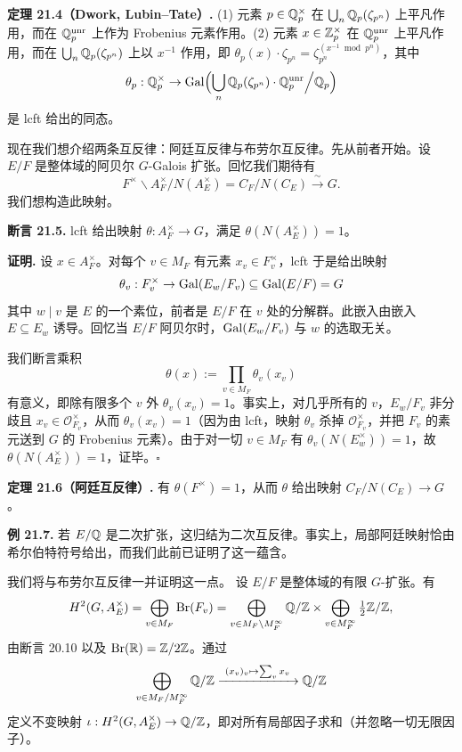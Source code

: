 \textbf{定理 21.4（Dwork, Lubin--Tate）.} (1) 元素 $p\in\mathbb{Q}_p^\times$ 在 $\bigcup_n\mathbb{Q}_p(\zeta_{p^n})$ 上平凡作用，而在 $\mathbb{Q}_p^{\mathrm{unr}}$ 上作为 Frobenius 元素作用。(2) 元素 $x\in\mathbb{Z}_p^\times$ 在 $\mathbb{Q}_p^{\mathrm{unr}}$ 上平凡作用，而在 $\bigcup_n\mathbb{Q}_p(\zeta_{p^n})$ 上以 $x^{-1}$ 作用，即 $\theta_p(x)\cdot\zeta_{p^n}=\zeta_{p^n}^{(x^{-1}\bmod p^n)}$，其中
\[
\theta_p:\mathbb{Q}_p^\times\to\operatorname{Gal}\Bigl(\bigcup_n\mathbb{Q}_p(\zeta_{p^n})\cdot\mathbb{Q}_p^{\mathrm{unr}}\Big/\mathbb{Q}_p\Bigr)
\]
是 lcft 给出的同态。

现在我们想介绍两条互反律：阿廷互反律与布劳尔互反律。先从前者开始。设 $E/F$ 是整体域的阿贝尔 $G$-Galois 扩张。回忆我们期待有
\[
F^\times\backslash A_F^\times/N(A_E^\times)=C_F/N(C_E)\xrightarrow{\ \sim\ }G.
\]
我们想构造此映射。

\textbf{断言 21.5.} lcft 给出映射 $\theta:A_F^\times\to G$，满足 $\theta(N(A_E^\times))=1$。

\textbf{证明.} 设 $x\in A_F^\times$。对每个 $v\in M_F$ 有元素 $x_v\in F_v^\times$，lcft 于是给出映射
\[
\theta_v:F_v^\times\to\operatorname{Gal}(E_w/F_v)\subseteq\operatorname{Gal}(E/F)=G
\]
其中 $w\mid v$ 是 $E$ 的一个素位，前者是 $E/F$ 在 $v$ 处的分解群。此嵌入由嵌入 $E\subseteq E_w$ 诱导。回忆当 $E/F$ 阿贝尔时，$\operatorname{Gal}(E_w/F_v)$ 与 $w$ 的选取无关。

我们断言乘积
\[
\theta(x):=\prod_{v\in M_F}\theta_v(x_v)
\]
有意义，即除有限多个 $v$ 外 $\theta_v(x_v)=1$。事实上，对几乎所有的 $v$，$E_w/F_v$ 非分歧且 $x_v\in\mathcal{O}_{F_v}^\times$，从而 $\theta_v(x_v)=1$（因为由 lcft，映射 $\theta_v$ 杀掉 $\mathcal{O}_{F_v}^\times$，并把 $F_v$ 的素元送到 $G$ 的 Frobenius 元素）。由于对一切 $v\in M_F$ 有 $\theta_v(N(E_w^\times))=1$，故 $\theta(N(A_E^\times))=1$，证毕。\hfill$\square$

\textbf{定理 21.6（阿廷互反律）.} 有 $\theta(F^\times)=1$，从而 $\theta$ 给出映射 $C_F/N(C_E)\to G$。

\textbf{例 21.7.} 若 $E/\mathbb{Q}$ 是二次扩张，这归结为二次互反律。事实上，局部阿廷映射恰由希尔伯特符号给出，而我们此前已证明了这一蕴含。

我们将与布劳尔互反律一并证明这一点。
设 $E/F$ 是整体域的有限 $G$-扩张。有
\[
H^2(G,A_E^\times)=\bigoplus_{v\in M_F}\operatorname{Br}(F_v)=\bigoplus_{v\in M_F\setminus M_F^\infty}\mathbb{Q}/\mathbb{Z}\times\bigoplus_{v\in M_F^\infty}\tfrac12\mathbb{Z}/\mathbb{Z},
\]
由断言 20.10 以及 $\operatorname{Br}(\mathbb{R})=\mathbb{Z}/2\mathbb{Z}$。通过
\[
\bigoplus_{v\in M_F/M_F^\infty}\Q/\Z\xrightarrow{\ (x_v)_v\mapsto\sum_vx_v\ }\Q/\Z
\]
定义不变映射 $\iota:H^2(G,A_E^\times)\to\mathbb{Q}/\mathbb{Z}$，即对所有局部因子求和（并忽略一切无限因子）。


